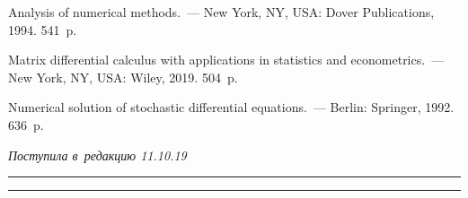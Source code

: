\begin{multicols}{2}
{{\begin{thebibliography}{9}



 Analysis of numerical methods.~--- New York, 
NY, USA: Dover Publications, 1994. 541~p.

 Matrix differential calculus with applications in statistics and 
econometrics.~---
 New York, NY, USA: Wiley, 2019. 504~p.

 Numerical solution of stochastic differential 
equations.~--- Berlin: Springer, 1992. 636~p. %

\end{thebibliography}

 }
 }

\end{multicols}

\vspace*{-6pt}

\hfill{\small\textit{Поступила в~редакцию 11.10.19}}

\vspace*{8pt}




\hrule

\vspace*{2pt}

\hrule


\def\tit{NUMERICAL SCHEMES OF MARKOV JUMP PROCESS FILTERING GIVEN 
DISCRETIZED OBSERVATIONS III: MULTIPLICATIVE NOISES CASE}


\def\titkol{Numerical schemes of Markov jump process filtering given 
discretized observations III: Multiplicative noises case}


